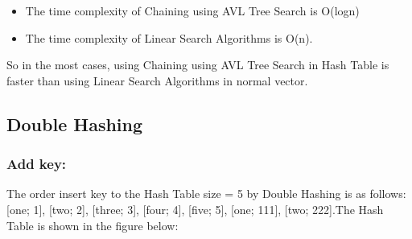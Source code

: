 \begin{itemize}
	\item The time complexity of Chaining using AVL Tree Search is O(logn)
	\item The time complexity of Linear Search Algorithms is O(n).
\end{itemize}
So in the most cases, using Chaining using AVL Tree Search in Hash Table is faster than using Linear Search Algorithms in normal vector.


\pagebreak
\subsection{Double Hashing}

\subsubsection{Add key:}
The order insert key to the Hash Table size = 5 by Double Hashing is as follows: [one; 1], [two; 2], [three; 3], [four; 4], [five; 5], [one; 111], [two; 222].The Hash Table is shown in the figure below:

